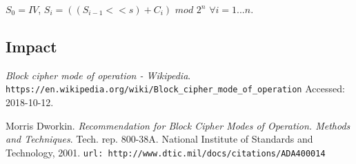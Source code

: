 \documentclass[11pt]{article}
\begin{document}
$S_0 = IV$, $S_i = ((S_{i-1} << s) + C_i)$ $mod$ $2^n$ $\forall i = 1...n$.

\subsection{Impact}



\newpage
\begin{thebibliography}{99}

{\em Block cipher mode of operation - Wikipedia}.
  \verb|https://en.wikipedia.org/wiki/Block_cipher_mode_of_operation|
  \newblock Accessed: 2018-10-12.

Morris Dworkin.
  {\em Recommendation for Block Cipher Modes of Operation. Methods and Techniques}.
  Tech. rep. 800-38A. National Institute of Standards and Technology, 2001.
  \newblock \verb|url: http://www.dtic.mil/docs/citations/ADA400014|

\end{thebibliography}
\end{document}
